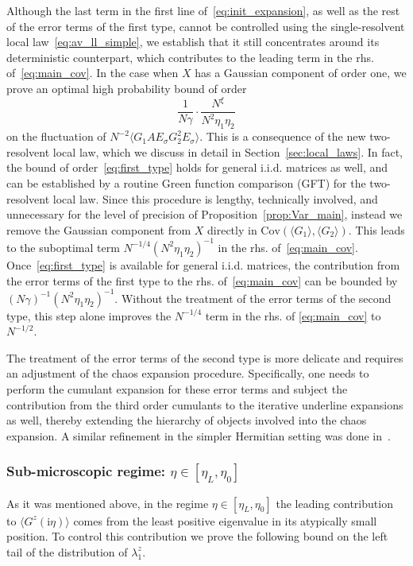 \documentclass[10pt]{amsart}
\numberwithin{equation}{section}
\newcommand{\Cov}{\mathrm{Cov}}
\newcommand{\ii}{\mathrm{i}}
\begin{document}
Although the last term in the first line of~\eqref{eq:init_expansion}, as well as the rest of the error terms of the first type, cannot be controlled using the single-resolvent local law~\eqref{eq:av_ll_simple}, we establish that it still concentrates around its deterministic counterpart, which contributes to the leading term in the rhs. of~\eqref{eq:main_cov}. In the case when $X$ has a Gaussian component of order one, we prove an optimal high probability bound of order
\begin{equation}
\frac{1}{N\gamma}\cdot\frac{N^\xi}{N^2\eta_1\eta_2}
\label{eq:first_type}
\end{equation}
on the fluctuation of $N^{-2}\langle G_1AE_\sigma G_2^2E_\sigma\rangle$. This is a consequence of the new two-resolvent local law, which we discuss in detail in Section~\ref{sec:local_laws}. In fact, the bound of order~\eqref{eq:first_type} holds for general i.i.d. matrices as well, and can be established by a routine Green function comparison (GFT) for the two-resolvent local law. Since this procedure is lengthy, technically involved, and unnecessary for the level of precision of Proposition~\ref{prop:Var_main}, instead we remove the Gaussian component from $X$ directly in $\Cov(\langle G_1\rangle,\langle G_2\rangle)$. This leads to the suboptimal term $N^{-1/4}(N^2\eta_1\eta_2)^{-1}$ in the rhs. of~\eqref{eq:main_cov}. Once~\eqref{eq:first_type} is available for general i.i.d. matrices, the contribution from the error terms of the first type to the rhs. of~\eqref{eq:main_cov} can be bounded by $(N\gamma)^{-1}(N^2\eta_1\eta_2)^{-1}$. Without the treatment of the error terms of the second type, this step alone improves the $N^{-1/4}$ term in the rhs. of \eqref{eq:main_cov} to~$N^{-1/2}$.
 
The treatment of the error terms of the second type is more delicate and requires an adjustment of the chaos expansion procedure. Specifically, one needs to perform the cumulant expansion for these error terms and subject the contribution from the third order cumulants to the iterative underline expansions as well, thereby extending the hierarchy of objects involved into the chaos expansion. A similar refinement in the simpler Hermitian setting was done in~\cite{Knowles20}.





\subsubsection{Sub-microscopic regime: $\eta\in [\eta_L,\eta_0]$}\label{sec:small_eta} As it was mentioned above, in the regime $\eta\in [\eta_L,\eta_0]$ the leading contribution to $\langle G^z(\ii\eta)\rangle$ comes from the least positive eigenvalue in its atypically small position. To control this contribution we prove the following bound on the left tail of the distribution of $\lambda_1^z$.
\end{document}
